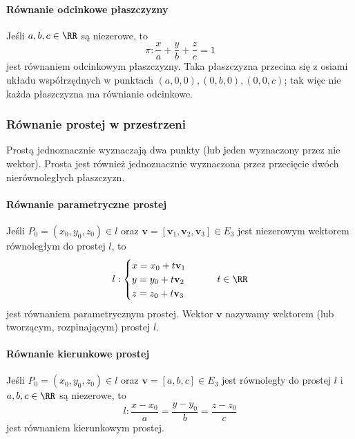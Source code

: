 \paragraph{Równanie odcinkowe płaszczyzny} Jeśli $a, b, c \in \RR$ są niezerowe, to
\begin{equation}
    \pi : \frac{x}{a} + \frac{y}{b} + \frac{z}{c} = 1
\end{equation}
jest równaniem odcinkowym płaszczyzny. Taka płaszczyzna przecina się z osiami układu współrzędnych w punktach $(a, 0, 0), (0, b, 0), (0, 0, c)$; tak więc nie każda płaszczyzna ma równianie odcinkowe.

\subsubsection{Równanie prostej w przestrzeni}
Prostą jednoznacznie wyznaczają dwa punkty (lub jeden wyznaczony przez nie wektor). Prosta jest również jednoznacznie wyznaczona przez przecięcie dwóch nierównoległych płaszczyzn.

\paragraph{Równanie parametryczne prostej} Jeśli $P_0 = (x_0, y_0, z_0) \in l$ oraz $\mathbf{v} = [\mathbf{v}_1, \mathbf{v}_2, \mathbf{v}_3] \in E_3$ jest niezerowym wektorem równoległym do prostej $l$, to
\begin{equation} l : \begin{cases}
    x = x_0 + t\mathbf{v}_1 \\
    y = y_0 + t\mathbf{v}_2 \\
    z = z_0 + t\mathbf{v}_3
\end{cases} \qquad t \in \RR \end{equation}
jest równaniem parametrycznym prostej. Wektor $\mathbf{v}$ nazywamy wektorem  (lub tworzącym, rozpinającym) prostej $l$.

\paragraph{Równanie kierunkowe prostej} Jeśli $P_0 = (x_0, y_0, z_0) \in l$ oraz $\mathbf{v} = [a, b, c] \in E_3$ jest równoległy do prostej $l$ i $a, b, c \in \RR$ są niezerowe, to
\begin{equation}
    l : \frac{x - x_0}{a} = \frac{y - y_0}{b} = \frac{z - z_0}{c}
\end{equation}
jest równaniem kierunkowym prostej.

